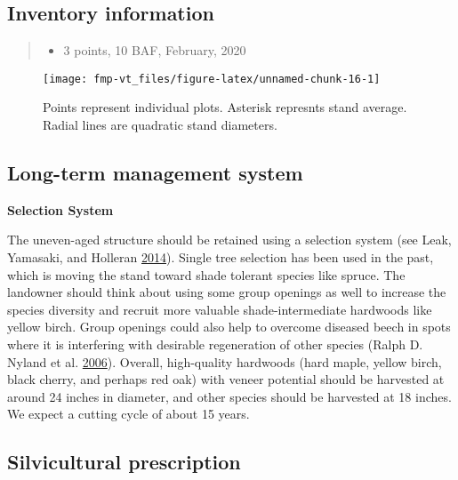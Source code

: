 \documentclass[]{tufte-handout}
\providecommand{\tightlist}{%
  \setlength{\itemsep}{0pt}\setlength{\parskip}{0pt}}
\begin{document}
\subsection{Inventory information}\label{inventory-information-2}

\begin{quote}
\begin{itemize}
\tightlist
\item
  3 points, 10 BAF, February, 2020
\end{itemize}
\end{quote}

\begin{figure}
\texttt{[image: fmp-vt\_files/figure-latex/unnamed-chunk-16-1]} \caption[Points represent individual plots]{Points represent individual plots. Asterisk represnts stand average. Radial lines are quadratic stand diameters.}\label{fig:unnamed-chunk-16}
\end{figure}

\subsection{Long-term management
system}\label{long-term-management-system-2}

\textbf{Selection System}

The uneven-aged structure should be retained using a selection system
(see Leak, Yamasaki, and Holleran
\protect\hyperlink{ref-leak_silvicultural_2014}{2014}). Single tree
selection has been used in the past, which is moving the stand toward
shade tolerant species like spruce. The landowner should think about
using some group openings as well to increase the species diversity and
recruit more valuable shade-intermediate hardwoods like yellow birch.
Group openings could also help to overcome diseased beech in spots where
it is interfering with desirable regeneration of other species (Ralph D.
Nyland et al. \protect\hyperlink{ref-nyland_interference_2006}{2006}).
Overall, high-quality hardwoods (hard maple, yellow birch, black cherry,
and perhaps red oak) with veneer potential should be harvested at around
24 inches in diameter, and other species should be harvested at 18
inches. We expect a cutting cycle of about 15 years.

\subsection{Silvicultural
prescription}\label{silvicultural-prescription-2}
\end{document}
